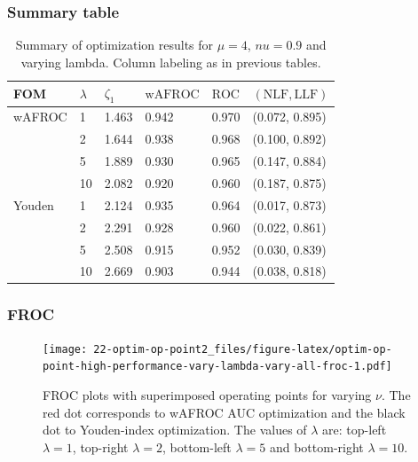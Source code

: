 \documentclass[
]{book}
\begin{document}
\hypertarget{summary-table-6}{%
\subsubsection{Summary table}\label{summary-table-6}}

\begin{table}

\caption{\label{tab:optim-op-point-high-performance-vary-lambda-table-vary-all}Summary of optimization results for $\mu = 4$, $nu = 0.9$ and varying lambda. Column labeling as in previous tables.}
\centering
\fontsize{10}{12}\selectfont
\begin{tabular}[t]{llllll}
\toprule
FOM & $\lambda$ & $\zeta_1$ & $\text{wAFROC}$ & $\text{ROC}$ & $\left( \text{NLF}, \text{LLF}\right)$\\
\midrule
wAFROC & 1 & 1.463 & 0.942 & 0.970 & (0.072, 0.895)\\
 & 2 & 1.644 & 0.938 & 0.968 & (0.100, 0.892)\\
 & 5 & 1.889 & 0.930 & 0.965 & (0.147, 0.884)\\
 & 10 & 2.082 & 0.920 & 0.960 & (0.187, 0.875)\\
Youden & 1 & 2.124 & 0.935 & 0.964 & (0.017, 0.873)\\
\addlinespace
 & 2 & 2.291 & 0.928 & 0.960 & (0.022, 0.861)\\
 & 5 & 2.508 & 0.915 & 0.952 & (0.030, 0.839)\\
 & 10 & 2.669 & 0.903 & 0.944 & (0.038, 0.818)\\
\bottomrule
\end{tabular}
\end{table}

\hypertarget{froc-7}{%
\subsubsection{FROC}\label{froc-7}}

\begin{figure}
\centering
\texttt{[image: 22-optim-op-point2\_files/figure-latex/optim-op-point-high-performance-vary-lambda-vary-all-froc-1.pdf]}
\caption{\label{fig:optim-op-point-high-performance-vary-lambda-vary-all-froc}FROC plots with superimposed operating points for varying \(\nu\). The red dot corresponds to wAFROC AUC optimization and the black dot to Youden-index optimization. The values of \(\lambda\) are: top-left \(\lambda = 1\), top-right \(\lambda = 2\), bottom-left \(\lambda = 5\) and bottom-right \(\lambda = 10\).}
\end{figure}
\end{document}
